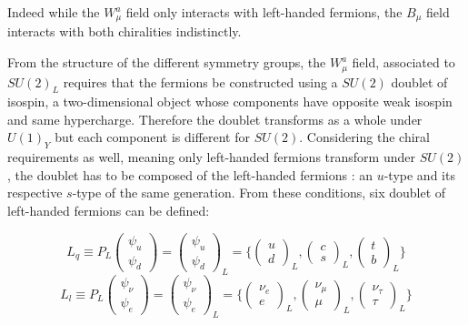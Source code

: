 Indeed while the $W_{\mu}^a$ field only interacts with left-handed fermions, the $B_{\mu}$ field interacts with both chiralities indistinctly.

From the structure of the different symmetry groups, the $W_{\mu}^a$ field, associated to $SU(2)_L$ requires that the fermions be constructed using a $SU(2)$ doublet of isospin, a two-dimensional object whose components have opposite weak isospin and same hypercharge. Therefore the doublet transforms as a whole under $U(1)_Y$ but each component is different for $SU(2)$. Considering the chiral requirements as well, meaning only left-handed fermions transform under $SU(2)$, the doublet has to be composed of the left-handed fermions : an $u$-type and its respective $s$-type of the same generation. From these conditions, six doublet of left-handed fermions can be defined:

\begin{equation}
    L_q \equiv P_L \begin{pmatrix} \psi_u \\ \psi_d \end{pmatrix} = \begin{pmatrix} \psi_u \\ \psi_d \end{pmatrix}_L = \Bigg\{ \begin{pmatrix} u \\ d \end{pmatrix}_L , \begin{pmatrix} c \\ s \end{pmatrix}_L , \begin{pmatrix} t \\ b \end{pmatrix}_L \Bigg\} 
\end{equation}
\begin{equation}
    L_l \equiv P_L \begin{pmatrix} \psi_{\nu} \\ \psi_e \end{pmatrix} = \begin{pmatrix} \psi_{\nu} \\ \psi_e \end{pmatrix}_L = \Bigg\{ \begin{pmatrix} \nu_e \\ e \end{pmatrix}_L , \begin{pmatrix} \nu_{\mu} \\ \mu \end{pmatrix}_L , \begin{pmatrix} \nu_{\tau} \\ \tau \end{pmatrix}_L \Bigg\} 
\end{equation}

